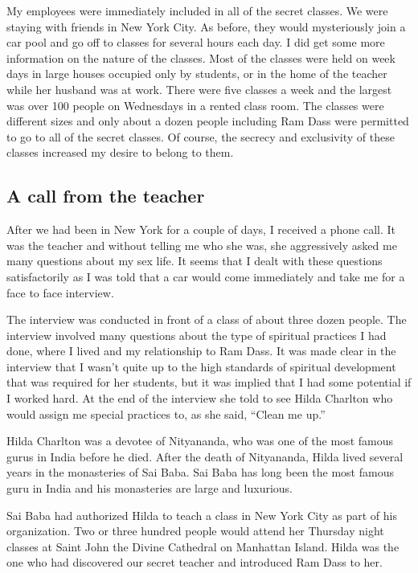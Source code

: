 \documentclass[a5paper,10pt,english]{book}
\begin{document}
\sphinxAtStartPar
My employees were immediately included in all of the secret classes. We
were staying with friends in New York City. As before, they would
mysteriously join a car pool and go off to classes for several hours
each day. I did get some more information on the nature of the classes.
Most of the classes were held on week days in large houses occupied only
by students, or in the home of the teacher while her husband was at
work. There were five classes a week and the largest was over 100 people
on Wednesdays in a rented class room. The classes were different sizes
and only about a dozen people including Ram Dass were permitted to go to
all of the secret classes. Of course, the secrecy and exclusivity of
these classes increased my desire to belong to them.


\subsection{A call from the teacher}
\label{\detokenize{psychopaths:a-call-from-the-teacher}}
\sphinxAtStartPar
After we had been in New York for a couple of days, I received a phone
call. It was the teacher and without telling me who she was, she
aggressively asked me many questions about my sex life. It seems that I
dealt with these questions satisfactorily as I was told that a car would
come immediately and take me for a face to face interview.

\sphinxAtStartPar
The interview was conducted in front of a class of about three dozen
people. The interview involved many questions about the type of
spiritual practices I had done, where I lived and my relationship to Ram
Dass. It was made clear in the interview that I wasn’t quite up to the
high standards of spiritual development that was required for her
students, but it was implied that I had some potential if I worked
hard. At the end of the interview she told to see Hilda Charlton who
would assign me special practices to, as she said, “Clean me up.”

\sphinxAtStartPar
Hilda Charlton was a devotee of Nityananda, who was one of the most
famous gurus in India before he died. After the death of Nityananda,
Hilda lived several years in the monasteries of Sai Baba. Sai Baba has
long been the most famous guru in India and his monasteries are large
and luxurious.

\sphinxAtStartPar
Sai Baba had authorized Hilda to teach a class in New York City as part
of his organization. Two or three hundred people would attend her
Thursday night classes at Saint John the Divine Cathedral on Manhattan
Island. Hilda was the one who had discovered our secret teacher and
introduced Ram Dass to her.
\end{document}
